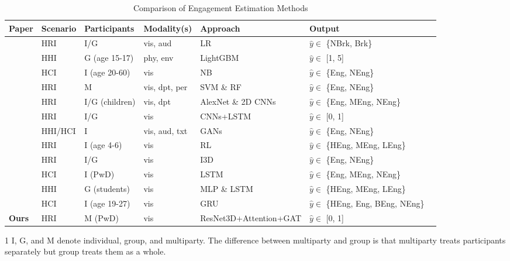 \documentclass[VANCOUVER,STIX1COL]{WileyNJD-v2}
\begin{document}
\begin{table}[htb!]
  \centering
  \caption{Comparison of Engagement Estimation Methods}
  \label{t:references}
  \begin{threeparttable}[b]
  \begin{tabular*}{\textwidth}{l@{\extracolsep{\fill}}llllll}
  \toprule
  \textbf{Paper} & \textbf{Scenario} & \textbf{Participants}\tnote{1} & \textbf{Modality(s)}\tnote{2} & \textbf{Approach} \tnote{3} & \textbf{Output}\tnote{4} \\
  \midrule
  \cite{BenYoussef2019Early} & HRI & I/G & vis, aud & LR & $\hat{y} \in$ \{NBrk, Brk\} \\
  \cite{Gao2020NGage} & HHI & G (age 15-17) & phy, env & LightGBM & $\hat{y} \in$ [1, 5] \\
  \cite{Monkaresi2017Automated} & HCI & I (age 20-60) & vis & NB & $\hat{y} \in$ \{Eng, NEng\} \\
  \cite{Salam2017Fully} & HRI & M & vis, dpt, per & SVM \& RF & $\hat{y} \in$ \{Eng, NEng\} \\
  \midrule
  \cite{Anagnostopoulou2021Engagement} & HRI & I/G (children) & vis, dpt & AlexNet \& 2D CNNs & $\hat{y} \in$ \{Eng, MEng, NEng\} \\
  \cite{DelDuchetto2020Are} & HRI & I/G & vis & CNNs+LSTM & $\hat{y} \in$ [0, 1] \\
  \cite{Guhan2020ABCNet} & HHI/HCI & I & vis, aud, txt & GANs & $\hat{y} \in$ \{Eng, NEng\} \\
  \cite{Rudovic2019Personalized} & HRI & I (age 4-6) & vis & RL & $\hat{y} \in$ \{HEng, MEng, LEng\} \\
  \cite{Saleh2021Improving} & HRI & I/G & vis & I3D & $\hat{y} \in$ \{Eng, NEng\} \\
  \cite{Steinert2020Engagement} & HCI & I (PwD) & vis & LSTM & $\hat{y} \in$ \{Eng, MEng, NEng\} \\
  \cite{Sumer2021Multimodal} & HHI & G (students) & vis & MLP \& LSTM & $\hat{y} \in$ \{HEng, MEng, LEng\} \\
  \cite{Zhu2020Multirate} & HCI &
  I (age 19-27) & vis & GRU & $\hat{y} \in$ \{HEng, Eng, BEng, NEng\} \\
  \midrule
  \textbf{Ours} & HRI & M (PwD) & vis & ResNet3D+Attention+GAT & $\hat{y} \in$ [0, 1] \\
  \bottomrule
  \end{tabular*}
  \begin{tablenotes}
    \item [1] I, G, and M denote individual, group, and multiparty. The difference between multiparty and group is that multiparty treats participants separately but group treats them as a whole.

\end{tablenotes}
\end{threeparttable}
\end{table}
\end{document}
